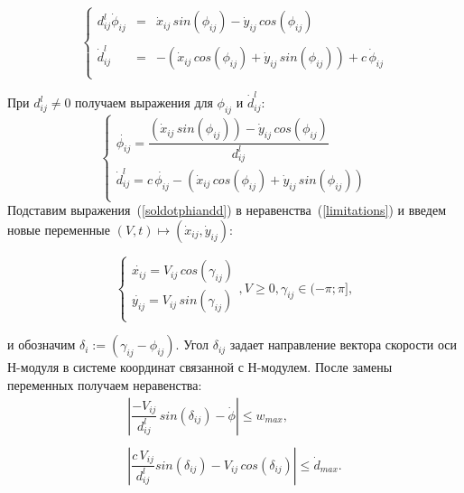 \begin{equation}
\label{kinematics_solved}
\left\{
\begin{array}{rcl}
	d^l_{ij}\dot{\phi}_{ij} & = & \dot{x}_{ij}\,sin(\phi_{ij}) - \dot{y}_{ij}\,cos(\phi_{ij})\\
	\\
	\dot{d}^l_{ij} & = & -(\dot{x}_{ij}\,cos(\phi_{ij})+\dot{y}_{ij}\,sin(\phi_{ij}))+c\,\dot{\phi}_{ij}\\
\end{array}\right.
\end{equation}

При $d^l_{ij}\ne 0$ получаем выражения для $\phi_{ij}$ и $\dot{d}^l_{ij}$:
	\begin{equation}\label{soldotphiandd}
	\left\{
	\begin{array}{lcr}
	\dot{\phi_{ij}} = \dfrac{(\dot{x}_{ij}\,sin(\phi_{ij}))-\dot{y}_{ij}\,cos(\phi_{ij})}{d^l_{ij}}\\
	\dot{d}^l_{ij} = c\,\dot{\phi_{ij}}-(\dot{x}_{ij}\,cos(\phi_{ij})+\dot{y}_{ij}\,sin(\phi_{ij}))\\
	\end{array}
	\right.
	\end{equation}
Подставим выражения~(\ref{soldotphiandd}) в неравенства~(\ref{limitations}) и введем новые переменные $(V,t)\mapsto(\dot{x}_{ij},\dot{y}_{ij}):$

	\begin{equation}
	\label{substitution}
	\left\{
	\begin{array}{lcr}
	\dot{x_{ij}} = V_{ij}\,cos(\gamma_{ij})\\
	\dot{y_{ij}} = V_{ij}\,sin(\gamma_{ij})\\
	\end{array}
	\right.
	, V \geq 0 , \gamma_{ij}\in(-\pi;\pi],
	\end{equation}
	
и обозначим $\delta_i:=(\gamma_{ij}-\phi_{ij})$. Угол $\delta_{ij}$ задает направление вектора скорости оси Н-модуля в системе координат связанной с Н-модулем. После замены переменных получаем неравенства:
	\begin{equation}
	\label{limitations_subsed}
	\begin{array}{lcr}
	\left|\dfrac{-V_{ij}}{d^l_{ij}}\,sin(\delta_{ij})-\dot{\phi}\right|\leq{w_{max}},\\
	\\
	\left|\dfrac{c\,V_{ij}}{d^l_{ij}}sin(\delta_{ij})-V_{ij}\,cos(\delta_{ij})\right|\leq{\dot{d}_{max}}.\\
	\end{array}
	\end{equation}
	
